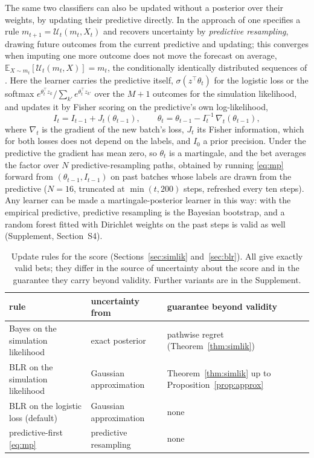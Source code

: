 \documentclass[11pt]{article}
\newcommand{\E}{\mathbb{E}}
\theoremstyle{remark}
\begin{document}
The same two classifiers can also be updated without a posterior over their
weights, by updating their predictive directly. In the approach of
\citet{fong2023martingale} one specifies a rule
$m_{t+1} = \mathcal U_t(m_t, X_t)$ and recovers uncertainty by
\emph{predictive resampling}, drawing future outcomes from the current
predictive and updating; this converges when imputing one more outcome does
not move the forecast on average, $\E_{X \sim m_t}[\mathcal U_t(m_t, X)] = m_t$,
the conditionally identically distributed sequences of \citet{berti2004limit}.
Here the learner carries the predictive itself, $\sigma(z^\top\theta_t)$ for
the logistic loss or the softmax $e^{\theta_t^\top z_k}/\sum_{k'} e^{\theta_t^\top z_{k'}}$
over the $M+1$ outcomes for the simulation likelihood, and updates it by
Fisher scoring on the predictive's own log-likelihood,
\begin{equation}\label{eq:mp}
I_t = I_{t-1} + J_t(\theta_{t-1}), \qquad
\theta_t = \theta_{t-1} - I_t^{-1}\, \nabla_t(\theta_{t-1}),
\end{equation}
where $\nabla_t$ is the gradient of the new batch's loss, $J_t$ its Fisher
information, which for both losses does not depend on the labels, and $I_0$ a
prior precision. Under the predictive the gradient has mean zero, so
$\theta_t$ is a martingale, and the bet averages the factor over $N$
predictive-resampling paths, obtained by running \eqref{eq:mp} forward from
$(\theta_{t-1}, I_{t-1})$ on past batches whose labels are drawn from the
predictive ($N = 16$, truncated at $\min(t, 200)$ steps, refreshed every ten
steps). Any learner can be made a martingale-posterior learner in this way:
with the empirical predictive, predictive resampling is the Bayesian
bootstrap, and a random forest fitted with Dirichlet weights on the past steps
is valid as well (Supplement, Section~S4).

\begin{table}[t]
\centering
\caption{Update rules for the score (Sections~\ref{sec:simlik}
and~\ref{sec:blr}). All give exactly valid bets; they differ in the source of
uncertainty about the score and in the guarantee they carry beyond validity.
Further variants are in the Supplement.}
\label{tab:rules}
\small
\begin{tabular}{lll}
\toprule
rule & uncertainty from & guarantee beyond validity \\
\midrule
Bayes on the simulation likelihood & exact posterior & pathwise regret (Theorem~\ref{thm:simlik}) \\
BLR on the simulation likelihood & Gaussian approximation & Theorem~\ref{thm:simlik} up to Proposition~\ref{prop:approx} \\
BLR on the logistic loss (default) & Gaussian approximation & none \\
predictive-first \eqref{eq:mp} & predictive resampling & none \\
\bottomrule
\end{tabular}
\end{table}
\end{document}
